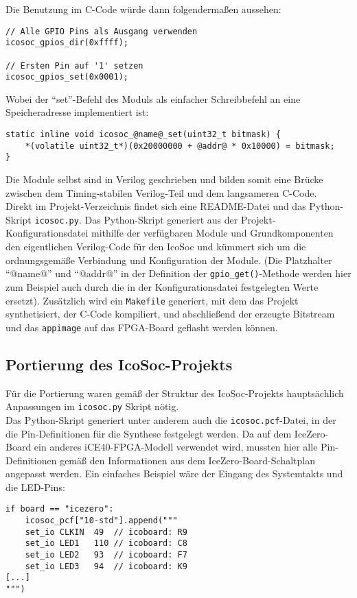 {Die Benutzung im C-Code würde dann folgendermaßen aussehen:

\begin{verbatim}
// Alle GPIO Pins als Ausgang verwenden
icosoc_gpios_dir(0xffff);

// Ersten Pin auf '1' setzen
icosoc_gpios_set(0x0001);
\end{verbatim}

Wobei der ``set''-Befehl des Moduls als einfacher Schreibbefehl an eine Speicheradresse implementiert ist:
\begin{verbatim}
static inline void icosoc_@name@_set(uint32_t bitmask) {
    *(volatile uint32_t*)(0x20000000 + @addr@ * 0x10000) = bitmask;
}
\end{verbatim}

Die Module selbst sind in Verilog geschrieben und bilden somit eine Brücke zwischen dem Timing-stabilen Verilog-Teil und dem langsameren C-Code.\\

Direkt im Projekt-Verzeichnis findet sich eine README-Datei und das Python-Skript {\tt icosoc.py}.
Das Python-Skript generiert aus der Projekt-Konfigurationsdatei mithilfe der verfügbaren Module und Grundkomponenten den eigentlichen Verilog-Code für den IcoSoc und kümmert sich um die ordnungsgemäße Verbindung und Konfiguration der Module. (Die Platzhalter ``@name@'' und ``@addr@'' in der Definition der {\tt gpio\_get()}-Methode werden hier zum Beispiel auch durch die in der Konfigurationsdatei festgelegten Werte ersetzt).
Zusätzlich wird ein {\tt Makefile} generiert, mit dem das Projekt synthetisiert, der C-Code kompiliert, und abschließend der erzeugte Bitstream und das {\tt appimage} auf das FPGA-Board geflasht werden können.

\subsection{Portierung des IcoSoc-Projekts}

Für die Portierung waren gemäß der Struktur des IcoSoc-Projekts hauptsächlich Anpassungen im {\tt icosoc.py} Skript nötig.\\
Das Python-Skript generiert unter anderem auch die {\tt icosoc.pcf}-Datei, in der die Pin-Definitionen für die Synthese festgelegt werden.
Da auf dem IceZero-Board ein anderes iCE40-FPGA-Modell verwendet wird, mussten hier alle Pin-Definitionen gemäß den Informationen aus dem IceZero-Board-Schaltplan\cite{doc:schematic} angepasst werden.
Ein einfaches Beispiel wäre der Eingang des Systemtakts und die LED-Pins: 
\begin{verbatim}
if board == "icezero":
    icosoc_pcf["10-std"].append("""
    set_io CLKIN  49  // icoboard: R9
    set_io LED1   110 // icoboard: C8
    set_io LED2   93  // icoboard: F7
    set_io LED3   94  // icoboard: K9
[...]
""")
\end{verbatim}

}

